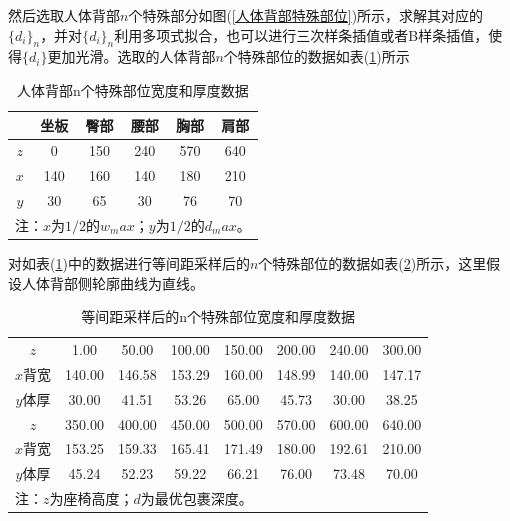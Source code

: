             \par
            然后选取人体背部$n$个特殊部分如图(\ref{人体背部特殊部位})所示，求解其对应的$\{d_i \}_n$，并对$\{d_i \}_n$利用多项式拟合，也可以进行三次样条插值或者B样条插值，使得$\{d_i \}$更加光滑。选取的人体背部$n$个特殊部位的数据如表(\ref{人体背部n个特殊部位宽度和厚度数据})所示
        \begin{table}[H]
        \centering
        \caption{人体背部n个特殊部位宽度和厚度数据}
        \label{人体背部n个特殊部位宽度和厚度数据}
        \begin{tabular}{cccccc}
        \toprule
        {}&   坐板 & 臀部 & 腰部 & 胸部 & 肩部\\
        \midrule
        $z$ &  0   & 150 & 240& 570 & 640\\
        $x$ &  140 & 160 & 140& 180 & 210\\
        $y$ &  30  & 65  & 30 & 76  & 70\\
        \bottomrule
        \multicolumn{6}{l}{\footnotesize 注：$x$为$1/2$的$w_max$；$y$为$1/2$的$d_max$。}\\
        \end{tabular}
        \end{table}
            \par
            对如表(\ref{人体背部n个特殊部位宽度和厚度数据})中的数据进行等间距采样后的$n$个特殊部位的数据如表(\ref{等间距采样后的n个特殊部位宽度和厚度数据})所示，这里假设人体背部侧轮廓曲线为直线。
        \begin{table}[H]
        \centering
        \caption{等间距采样后的n个特殊部位宽度和厚度数据}
        \label{等间距采样后的n个特殊部位宽度和厚度数据}
        \begin{tabular}{cccccccc}
        \toprule
        $z$ & 1.00   & 50.00  & 100.00 & 150.00 & 200.00 & 240.00 & 300.00\\
        $x$背宽 & 140.00 & 146.58 & 153.29 & 160.00 & 148.99 & 140.00 & 147.17\\
        $y$体厚  & 30.00  & 41.51  & 53.26  & 65.00  & 45.73  & 30.00  & 38.25 \\
        \hline
        \hline
        $z$ & 350.00 & 400.00 & 450.00 & 500.00 & 570.00 & 600.00 & 640.00\\
        $x$背宽 & 153.25 & 159.33 & 165.41 & 171.49 & 180.00 & 192.61 & 210.00\\
        $y$体厚 & 45.24  & 52.23  & 59.22  & 66.21  & 76.00  & 73.48  & 70.00 \\
        \bottomrule
        \multicolumn{8}{l}{\footnotesize 注：$z$为座椅高度；$d$为最优包裹深度。}\\
        \end{tabular}
        \end{table}

